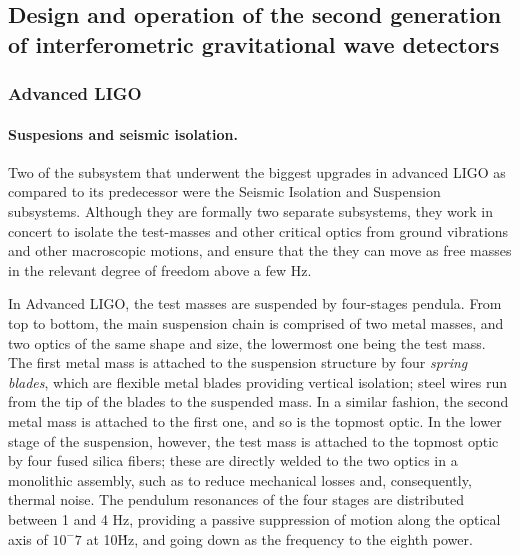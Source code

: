 \subsection{Design and operation of the second generation of interferometric gravitational wave detectors}\label{subsec:2ndgen}


\subsubsection{Advanced LIGO}

\paragraph*{Suspesions and seismic isolation.}
Two of the subsystem that underwent the biggest upgrades in advanced LIGO as compared to its predecessor were the Seismic Isolation and Suspension subsystems. Although they are formally two separate subsystems, they work in concert to isolate the test-masses and other critical optics from ground vibrations and other macroscopic motions, and ensure that the they can move as free masses in the relevant degree of freedom above a few Hz.

In Advanced LIGO, the test masses are suspended by four-stages pendula. From top to bottom, the main suspension chain is comprised of two metal masses, and two optics of the same shape and size, the lowermost one being the test mass. The first metal mass is attached to the suspension structure by four \textit{spring blades}, which are flexible metal blades providing vertical isolation; steel wires run from the tip of the blades to the suspended mass. In a similar fashion, the second metal mass is attached to the first one, and so is the topmost optic. In the lower stage of the suspension, however, the test mass is attached to the topmost optic by four fused silica fibers; these are directly welded to the two optics in a monolithic assembly, such as to reduce mechanical losses and, consequently, thermal noise. The pendulum resonances of the four stages are distributed between 1 and 4 Hz, providing a passive suppression of motion along the optical axis of $10^-7$ at 10\.Hz, and going down as the frequency to the eighth power.

